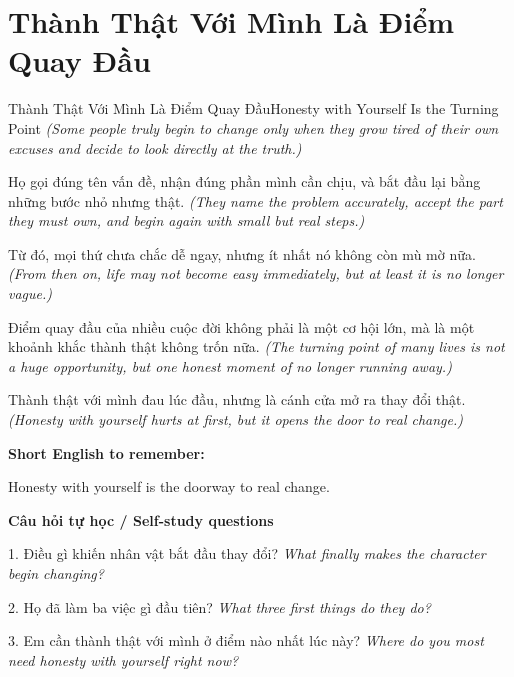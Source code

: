 \section{Thành Thật Với Mình Là Điểm Quay Đầu}
\begin{truyen}{Thành Thật Với Mình Là Điểm Quay Đầu}{Honesty with Yourself Is the Turning Point}
\textit{(Some people truly begin to change only when they grow tired of their own excuses and decide to look directly at the truth.)}

Họ gọi đúng tên vấn đề, nhận đúng phần mình cần chịu, và bắt đầu lại bằng những bước nhỏ nhưng thật.
\textit{(They name the problem accurately, accept the part they must own, and begin again with small but real steps.)}

Từ đó, mọi thứ chưa chắc dễ ngay, nhưng ít nhất nó không còn mù mờ nữa.
\textit{(From then on, life may not become easy immediately, but at least it is no longer vague.)}

Điểm quay đầu của nhiều cuộc đời không phải là một cơ hội lớn, mà là một khoảnh khắc thành thật không trốn nữa.
\textit{(The turning point of many lives is not a huge opportunity, but one honest moment of no longer running away.)}

\end{truyen}

\begin{baihoc}
Thành thật với mình đau lúc đầu, nhưng là cánh cửa mở ra thay đổi thật.
\textit{(Honesty with yourself hurts at first, but it opens the door to real change.)}
\end{baihoc}

\begin{ghinhoanh}
\textbf{Short English to remember:}

Honesty with yourself is the doorway to real change.

\end{ghinhoanh}

\begin{tuhocnhanh}
\textbf{Câu hỏi tự học / Self-study questions}

1. Điều gì khiến nhân vật bắt đầu thay đổi? \textit{What finally makes the character begin changing?}

2. Họ đã làm ba việc gì đầu tiên? \textit{What three first things do they do?}

3. Em cần thành thật với mình ở điểm nào nhất lúc này? \textit{Where do you most need honesty with yourself right now?}
\end{tuhocnhanh}
